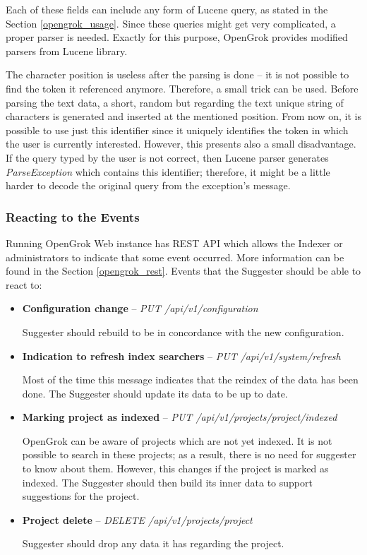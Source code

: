 Each of these fields can include any form of Lucene query, as stated in the Section \ref{opengrok_usage}. Since these queries might
get very complicated, a proper parser is needed. Exactly for this purpose, OpenGrok provides modified parsers from Lucene library.


The character position is
useless after the parsing is done – it is not possible to find the token it referenced anymore. Therefore, a small
trick can be used. Before parsing the text data, a short, random but regarding the text unique string of characters
is generated and inserted at the mentioned position. From now on, it is possible to use just this identifier since it
uniquely identifies the token in which the user is currently interested. However, this presents also a small disadvantage.
If the query typed by the user is not correct, then Lucene parser generates \textit{ParseException} which contains
this identifier; therefore, it might be a little harder to decode the original query from the exception's message.

\subsubsection{Reacting to the Events}

Running OpenGrok Web instance has REST API which allows the Indexer or administrators to indicate that some event occurred.
More information can be found in the Section \ref{opengrok_rest}. Events that the Suggester should be able to react to:
\begin{itemize}
    \item \textbf{Configuration change} – \textit{PUT /api/v1/configuration}

    Suggester should rebuild to be in concordance with the new configuration.
    \item \textbf{Indication to refresh index searchers} – \textit{PUT /api/v1/system/refresh}

    Most of the time this message indicates that the reindex of the data has been done. The Suggester
    should update its data to be up to date.

    \item \textbf{Marking project as indexed} – \textit{PUT /api/v1/projects/{project}/indexed}

    OpenGrok can be aware of projects which are not yet indexed. It is not possible to search in these projects;
    as a result, there is no need for suggester to know about them. However, this changes if the project is marked as indexed.
    The Suggester should then build its inner data to support suggestions for the project.

    \item \textbf{Project delete} – \textit{DELETE /api/v1/projects/{project}}

    Suggester should drop any data it has regarding the project.
\end{itemize}

